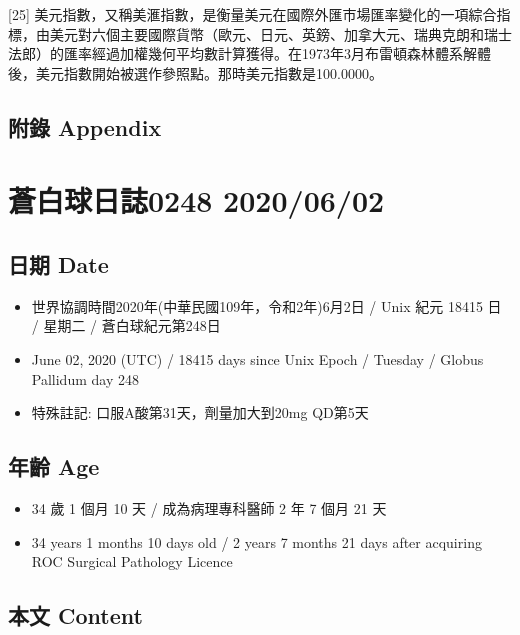 \documentclass[a5paper, 11pt
]{book}
\providecommand{\tightlist}{%
  \setlength{\itemsep}{0pt}\setlength{\parskip}{0pt}}
\begin{document}
{[}25{]}
美元指數，又稱美滙指數，是衡量美元在國際外匯市場匯率變化的一項綜合指標，由美元對六個主要國際貨幣（歐元、日元、英鎊、加拿大元、瑞典克朗和瑞士法郎）的匯率經過加權幾何平均數計算獲得。在1973年3月布雷頓森林體系解體後，美元指數開始被選作參照點。那時美元指數是100.0000。

\hypertarget{ux9644ux9304-appendix}{%
\subsection{附錄 Appendix}\label{ux9644ux9304-appendix}}

\hypertarget{ux84bcux767dux7403ux65e5ux8a8c0248-20200602}{%
\section{蒼白球日誌0248
2020/06/02}\label{ux84bcux767dux7403ux65e5ux8a8c0248-20200602}}

\hypertarget{ux65e5ux671f-date-1}{%
\subsection{日期 Date}\label{ux65e5ux671f-date-1}}

\begin{itemize}
\tightlist
\item
  世界協調時間2020年(中華民國109年，令和2年)6月2日 / Unix 紀元 18415 日
  / 星期二 / 蒼白球紀元第248日
\item
  June 02, 2020 (UTC) / 18415 days since Unix Epoch / Tuesday / Globus
  Pallidum day 248
\item
  特殊註記: 口服A酸第31天，劑量加大到20mg QD第5天
\end{itemize}

\hypertarget{ux5e74ux9f61-age-1}{%
\subsection{年齡 Age}\label{ux5e74ux9f61-age-1}}

\begin{itemize}
\tightlist
\item
  34 歲 1 個月 10 天 / 成為病理專科醫師 2 年 7 個月 21 天
\item
  34 years 1 months 10 days old / 2 years 7 months 21 days after
  acquiring ROC Surgical Pathology Licence
\end{itemize}

\hypertarget{ux672cux6587-content-1}{%
\subsection{本文 Content}\label{ux672cux6587-content-1}}
\end{document}
